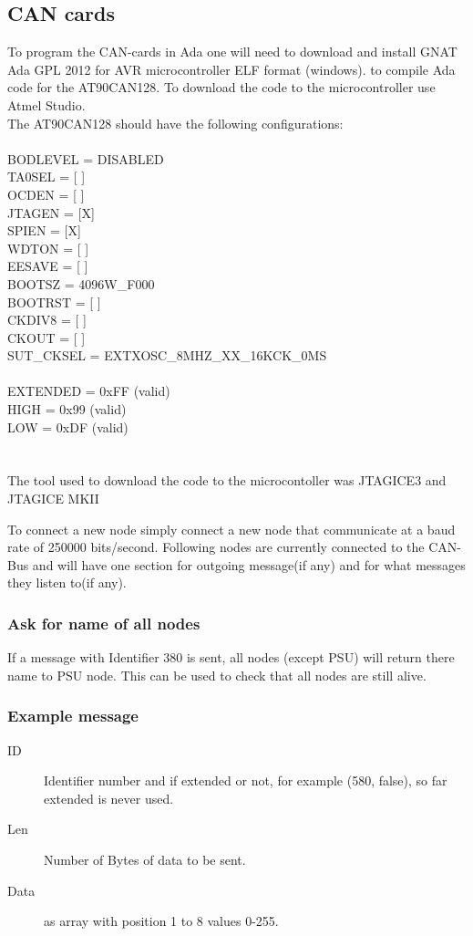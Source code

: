 \subsection{CAN cards}
\noindent 
To program the CAN-cards in Ada one will need to download and install GNAT Ada GPL 2012 for AVR microcontroller ELF format (windows).\cite{link to download}  to compile Ada code for the AT90CAN128. To download the code to the microcontroller use Atmel Studio\cite{Atmel Studio}.
\\The AT90CAN128 should have the following configurations: \\
\\
BODLEVEL = DISABLED\\
TA0SEL = [ ]\\
OCDEN = [ ]\\
JTAGEN = [X]\\
SPIEN = [X]\\
WDTON = [ ]\\
EESAVE = [ ]\\
BOOTSZ = 4096W_F000\\
BOOTRST = [ ]\\
CKDIV8 = [ ]\\
CKOUT = [ ]\\
SUT_CKSEL = EXTXOSC_8MHZ_XX_16KCK_0MS\\
\\
EXTENDED = 0xFF (valid)\\
HIGH = 0x99 (valid)\\
LOW = 0xDF (valid)\\
\\
\\
The tool used to download the code to the microcontoller was JTAGICE3\cite{JTAGICE3} and JTAGICE MKII\cite{JTAGICEMKII} 

To connect a new node simply connect a new node that communicate at a baud rate of 250000 bits/second. Following nodes are currently connected to the CAN-Bus and will have one section for outgoing message(if any) and for what messages they listen to(if any).

\subsubsection{Ask for name of all nodes}
If a message with Identifier 380 is sent, all nodes (except PSU) will return there name to PSU node. This can be used to check that all nodes are still alive.

\subsubsection{Example message}
\begin{description}
  \item[ID] Identifier number and if extended or not, for example (580, false), so far extended is never used.
  \item[Len] Number of Bytes of data to be sent.
  \item[Data] as array with position 1 to 8 values 0-255.
\end{description}

